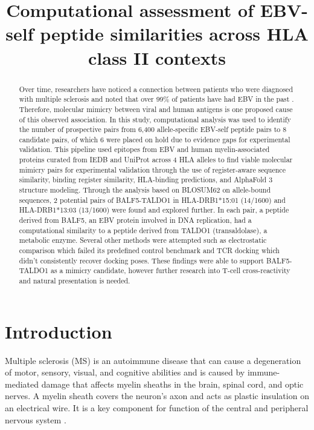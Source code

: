 \documentclass[11pt]{article}
\title{Computational assessment of EBV-self peptide similarities across HLA class II contexts}
\author{}\date{}
\begin{document}
\maketitle
\begin{abstract}
Over time, researchers have noticed a connection between patients who were diagnosed with multiple sclerosis and noted that over 99\% of patients have had EBV in the past \cite{bjornevik}. Therefore, molecular mimicry between viral and human antigens is one proposed cause of this observed association. In this study, computational analysis was used to identify the number of prospective pairs from 6,400 allele-specific EBV-self peptide pairs to 8 candidate pairs, of which 6 were placed on hold due to evidence gaps for experimental validation. This pipeline used epitopes from EBV and human myelin-associated proteins curated from IEDB and UniProt across 4 HLA alleles to find viable molecular mimicry pairs for experimental validation through the use of register-aware sequence similarity, binding register similarity, HLA-binding predictions, and AlphaFold 3 structure modeling. Through the analysis based on BLOSUM62 on allele-bound sequences, 2 potential pairs of BALF5-TALDO1 in HLA-DRB1*15:01 (14/1600) and HLA-DRB1*13:03 (13/1600) were found and explored further. In each pair, a peptide derived from BALF5, an EBV protein involved in DNA replication, had a computational similarity to a peptide derived from TALDO1 (transaldolase), a metabolic enzyme. Several other methods were attempted such as electrostatic comparison which failed its predefined control benchmark and TCR docking which didn’t consistently recover docking poses. These findings were able to support BALF5-TALDO1 as a mimicry candidate, however further research into T-cell cross-reactivity and natural presentation is needed.

\end{abstract}
\FloatBarrier\section{Introduction}
Multiple sclerosis (MS) is an autoimmune disease that can cause a degeneration of motor, sensory, visual, and cognitive abilities and is caused by immune-mediated damage that affects myelin sheaths in the brain, spinal cord, and optic nerves. A myelin sheath covers the neuron's axon and acts as plastic insulation on an electrical wire. It is a key component for function of the central and peripheral nervous system \cite{ninds}.
\end{document}
